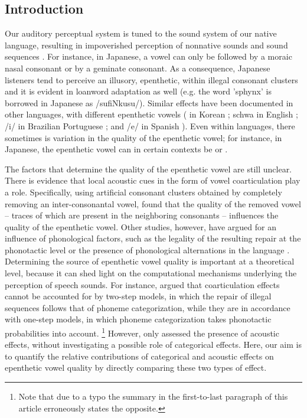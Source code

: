 \subsection{Introduction}

\setlength{\parindent}{5ex}

Our auditory perceptual system is tuned to the sound system of our native language, resulting in impoverished perception of nonnative sounds and sound sequences \cite{sebastian2005}. For instance, in Japanese, a vowel can only be followed by a moraic nasal consonant or by a geminate consonant. As a consequence, Japanese listeners tend to perceive an illusory, epenthetic,  within illegal consonant clusters \cite{dupoux1999, dehaene2000, dupoux2001, monahan2009, dupoux2011, guekozIS17} and it is evident in loanword adaptation as well (e.g. the word 'sphynx' is borrowed in Japanese as /sufiNkusu/). Similar effects have been documented in other languages, with different epenthetic vowels ( in Korean \cite{kabak2007, berent2008, dejong2012}; schwa in English \cite{berent2007, davidson2012}; /i/ in Brazilian Portuguese \cite{dupoux2011, guekozIS17}; and /e/ in Spanish \cite{halle2014}). Even within languages, there sometimes is variation in the quality of the epenthetic vowel; for instance, in Japanese, the epenthetic vowel can in certain contexts be  or  \cite{mattingley2015, guekozIS17}.

The factors that determine the quality of the epenthetic vowel are still unclear. There is evidence that local acoustic cues in the form of vowel coarticulation play a role. Specifically, using artificial consonant clusters obtained by completely removing an inter-consonantal vowel, \cite{dupoux2011} found that the quality of the removed vowel -- traces of which are present in the neighboring consonants -- influences the quality of the epenthetic vowel. Other studies, however, have argued for an influence of phonological factors, such as the legality of the resulting repair at the phonotactic level \cite{mattingley2015} or the presence of phonological alternations in the language \cite{durvasula2015}. Determining the source of epenthetic vowel quality is important at a theoretical level, because it can shed light on the computational mechanisms underlying the perception of speech sounds. For instance, \cite{dupoux2011} argued that coarticulation effects cannot be accounted for by two-step models, in which the repair of illegal sequences follows that of phoneme categorization, while they are in accordance with one-step models, in which phoneme categorization takes phonotactic probabilities into account.
\footnote{Note that due to a typo the summary in the first-to-last paragraph of this article erroneously states the opposite.} 
However, \cite{dupoux2011} only assessed the presence of acoustic effects, without investigating a possible role of categorical effects. Here, our aim is to quantify the relative contributions of categorical and acoustic effects on epenthetic vowel quality by directly comparing these two types of effect. 

